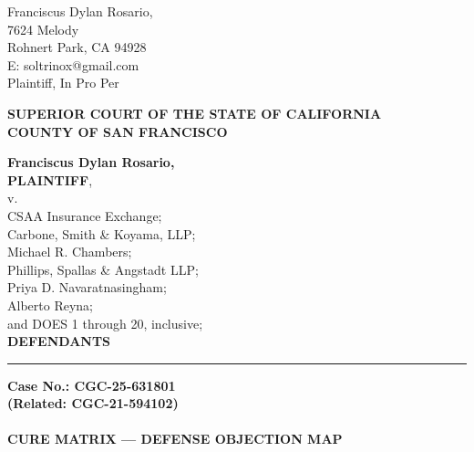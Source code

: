 

\nolinenumbers
\begin{singlespace}
Franciscus Dylan Rosario, \\
7624 Melody \\
Rohnert Park, CA 94928 \\
E: soltrinox@gmail.com \\
Plaintiff, In Pro Per \\
\end{singlespace}
\vspace*{9mm}
\begin{tightcenter}
\textbf{SUPERIOR COURT OF THE STATE OF CALIFORNIA} \\
\textbf{COUNTY OF SAN FRANCISCO}
\end{tightcenter}
\vspace*{2.25mm}
\nolinenumbers
\begin{minipage}[t]{3in}
    \raggedright
    \textbf{Franciscus Dylan Rosario,} \\ \textbf{PLAINTIFF}, \\
    \hspace{1cm} v. \\
    \small
    CSAA Insurance Exchange; \\
    Carbone, Smith \& Koyama, LLP; \\
    Michael R. Chambers; \\
    Phillips, Spallas \& Angstadt LLP; \\
    Priya D. Navaratnasingham; \\
    Alberto Reyna; \\
    and DOES 1 through 20, inclusive; \\
    \normalsize
    \textbf{DEFENDANTS}
    \makebox[3in]{\hrulefill}
\end{minipage}%
\hspace{3mm}
\begin{minipage}[t]{0.5pt}
    \vspace{0pt}
    \rule{0.5pt}{3.1in}
\end{minipage}
\hspace{3mm}
\begin{minipage}[t]{3in}
    \raggedright
    \noindent \textbf{Case No.: CGC-25-631801} \\
    \textbf{(Related: CGC-21-594102)} \\
    ~\\
    \textbf{CURE MATRIX — DEFENSE OBJECTION MAP}
\end{minipage}
\vspace*{6mm}
\linenumbers
